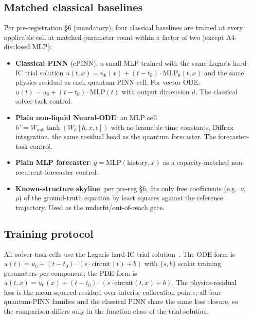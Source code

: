 \subsection{Matched classical baselines}
\label{sec:methods-baselines}

Per pre-registration §6 (mandatory), four classical baselines are
trained at every applicable cell at matched parameter count
within a factor of two (except A4-disclosed MLP):

\begin{itemize}
  \item \textbf{Classical PINN} (cPINN): a small MLP trained with
        the same Lagaris hard-IC trial solution
        $u(t, x) = u_0(x) + (t - t_0) \cdot \text{MLP}_\theta(t, x)$
        and the same physics residual as each quantum-PINN cell.
        For vector ODE: $u(t) = u_0 + (t - t_0) \cdot \text{MLP}(t)$
        with output dimension $d$. The classical solver-task control.
  \item \textbf{Plain non-liquid Neural-ODE}: an MLP cell
        $h' = W_{\text{out}}\tanh(W_h [h, x, t])$ with no learnable
        time constants, Diffrax integration, the same residual head
        as the quantum forecaster. The forecaster-task control.
  \item \textbf{Plain MLP forecaster}: $y = \text{MLP}(\text{history}, x)$
        as a capacity-matched non-recurrent forecaster control.
  \item \textbf{Known-structure skyline}: per pre-reg §6, fits only
        free coefficients (e.g.~$\nu$, $\rho$) of the ground-truth
        equation by least squares against the reference trajectory.
        Used as the underfit/out-of-reach gate.
\end{itemize}

\subsection{Training protocol}
\label{sec:methods-train}

All solver-task cells use the Lagaris hard-IC trial
solution~\cite{lagaris1998artificial}. The
ODE form is $u(t) = u_0 + (t - t_0) \cdot (s \cdot
\text{circuit}(t) + b)$ with $\{s, b\}$ scalar training parameters
per component; the PDE form is
$u(t, x) = u_0(x) + (t - t_0) \cdot
(s \cdot \text{circuit}(t, x) + b)$. The physics-residual loss is
the mean squared residual over interior collocation points;
all four quantum-PINN families and the classical PINN share the
same loss closure, so the comparison differs only in the function
class of the trial solution.

